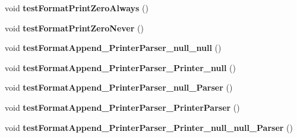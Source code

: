 \begin{DoxyCompactItemize}
\item 
\hypertarget{classorg_1_1joda_1_1time_1_1format_1_1_test_period_formatter_builder_a5fc19fcee29f908c3133e31940d32ee7}{void {\bfseries test\-Format\-Print\-Zero\-Always} ()}\label{classorg_1_1joda_1_1time_1_1format_1_1_test_period_formatter_builder_a5fc19fcee29f908c3133e31940d32ee7}

\item 
\hypertarget{classorg_1_1joda_1_1time_1_1format_1_1_test_period_formatter_builder_ad1b95f65007d1db6379fd1475a63a677}{void {\bfseries test\-Format\-Print\-Zero\-Never} ()}\label{classorg_1_1joda_1_1time_1_1format_1_1_test_period_formatter_builder_ad1b95f65007d1db6379fd1475a63a677}

\item 
\hypertarget{classorg_1_1joda_1_1time_1_1format_1_1_test_period_formatter_builder_afe16ecdff244b2202ac78f412111f79f}{void {\bfseries test\-Format\-Append\-\_\-\-Printer\-Parser\-\_\-null\-\_\-null} ()}\label{classorg_1_1joda_1_1time_1_1format_1_1_test_period_formatter_builder_afe16ecdff244b2202ac78f412111f79f}

\item 
\hypertarget{classorg_1_1joda_1_1time_1_1format_1_1_test_period_formatter_builder_a5966f7fd37a0aba6dbe768c1b28c639e}{void {\bfseries test\-Format\-Append\-\_\-\-Printer\-Parser\-\_\-\-Printer\-\_\-null} ()}\label{classorg_1_1joda_1_1time_1_1format_1_1_test_period_formatter_builder_a5966f7fd37a0aba6dbe768c1b28c639e}

\item 
\hypertarget{classorg_1_1joda_1_1time_1_1format_1_1_test_period_formatter_builder_a641f53dfdc678dabb4f2b5dbee8ddc99}{void {\bfseries test\-Format\-Append\-\_\-\-Printer\-Parser\-\_\-null\-\_\-\-Parser} ()}\label{classorg_1_1joda_1_1time_1_1format_1_1_test_period_formatter_builder_a641f53dfdc678dabb4f2b5dbee8ddc99}

\item 
\hypertarget{classorg_1_1joda_1_1time_1_1format_1_1_test_period_formatter_builder_a32948780e63ab3494b62ed7ddb87141a}{void {\bfseries test\-Format\-Append\-\_\-\-Printer\-Parser\-\_\-\-Printer\-Parser} ()}\label{classorg_1_1joda_1_1time_1_1format_1_1_test_period_formatter_builder_a32948780e63ab3494b62ed7ddb87141a}

\item 
\hypertarget{classorg_1_1joda_1_1time_1_1format_1_1_test_period_formatter_builder_a47f7e21b8a76717d1d46a68be8d3338b}{void {\bfseries test\-Format\-Append\-\_\-\-Printer\-Parser\-\_\-\-Printer\-\_\-null\-\_\-null\-\_\-\-Parser} ()}\label{classorg_1_1joda_1_1time_1_1format_1_1_test_period_formatter_builder_a47f7e21b8a76717d1d46a68be8d3338b}


\end{DoxyCompactItemize}
